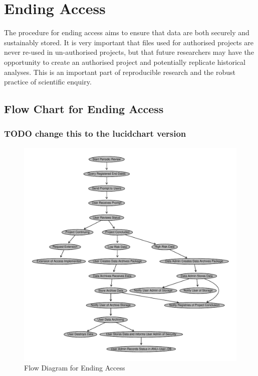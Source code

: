 \documentclass[a4paper]{article}
\begin{document}
\section{Ending Access}
\label{sec-5}

The procedure for ending access aims to ensure that data are both securely and sustainably stored.  It is very important that files used for authorised projects are never re-used in un-authorised projects, but that future researchers may have the opportunity to create an authorised project and potentially replicate historical analyses.  This is an important part of reproducible research and the robust practice of scientific enquiry.
\subsection{Flow Chart for Ending Access}
\label{sec-5-1}
\subsubsection{\textbf{TODO} change this to the lucidchart version}
\label{sec-5-1-1}


\begin{figure}[!h]
\centering
\includegraphics[width=\textwidth]{DataAccessFlowDiagram-EndAccess.pdf}
\caption{Flow Diagram for Ending Access}
\label{fig:DataAccessFlowDiagram-EndAccess}
\end{figure}
\clearpage
\end{document}

